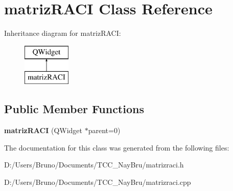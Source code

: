 \section{matriz\+R\+A\+CI Class Reference}
\label{classmatriz_r_a_c_i}
Inheritance diagram for matriz\+R\+A\+CI\+:\begin{figure}[H]
\begin{center}
\leavevmode
\includegraphics[height=2.000000cm]{classmatriz_r_a_c_i}
\end{center}
\end{figure}
\subsection*{Public Member Functions}
\begin{DoxyCompactItemize}
\item 
{\bfseries matriz\+R\+A\+CI} (Q\+Widget $\ast$parent=0)\label{classmatriz_r_a_c_i_ae380d9647713f9dc8c4dbc275f69a672}

\end{DoxyCompactItemize}


The documentation for this class was generated from the following files\+:\begin{DoxyCompactItemize}
\item 
D\+:/\+Users/\+Bruno/\+Documents/\+T\+C\+C\+\_\+\+Nay\+Bru/matrizraci.\+h\item 
D\+:/\+Users/\+Bruno/\+Documents/\+T\+C\+C\+\_\+\+Nay\+Bru/matrizraci.\+cpp\end{DoxyCompactItemize}
